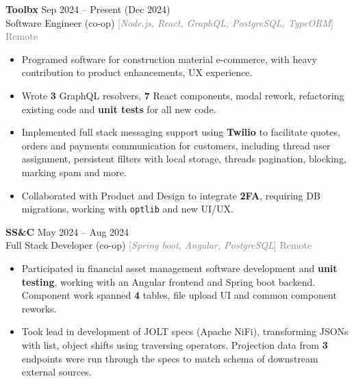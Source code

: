 \documentclass[9pt]{developercv} %
\begin{document}
\begin{minipage}[t]{\textwidth}
	\vspace{-\baselineskip}

	\textbf{Toolbx} \hfill Sep 2024 -- Present (Dec 2024) \\
	Software Engineer (co-op) \quad \textcolor{gray}{[\;\textit{Node.js, React, GraphQL, PostgreSQL, TypeORM}\;]} \hfill \textcolor{gray}{Remote}
	\begin{itemize}[noitemsep,topsep=0pt]
		\item Programed software for construction material e-commerce,
		with heavy contribution to product enhancements, UX experience.
		\item Wrote \textbf{3} GraphQL resolvers, \textbf{7} React components, modal rework, refactoring existing code and \textbf{unit tests} for all new code.
		\item Implemented full stack messaging support using \textbf{Twilio} to facilitate quotes, orders and payments communication for customers,
		including thread user assignment, persistent filters with local storage,
		threads pagination, blocking, marking spam and more.
		\item Collaborated with Product and Design to integrate \textbf{2FA}, requiring DB migrations, working with \texttt{optlib} and new UI/UX.
	\end{itemize}
	\vspace{0.3em}

	\textbf{SS\&C} \hfill May 2024 -- Aug 2024 \\
	Full Stack Developer (co-op) \quad \textcolor{gray}{[\;\textit{Spring boot, Angular, PostgreSQL}\;]} \hfill \textcolor{gray}{Remote}
	\begin{itemize}[noitemsep,topsep=0pt]
		\item Participated in financial asset management software development and \textbf{unit testing}, working with an Angular frontend and Spring boot backend.
		Component work spanned \textbf{4} tables, file upload UI and common component reworks.
		\item Took lead in development of JOLT specs (Apache NiFi), transforming JSONs with list, object shifts using traversing operators.
		Projection data from \textbf{3} endpoints were run through the specs to match schema of downstream external sources.
	\end{itemize}
	\vspace{0.3em}


\end{minipage}
\end{document}
